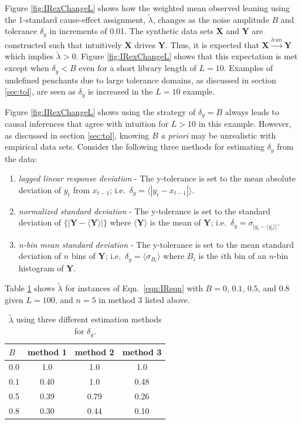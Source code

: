\documentclass[a4paper,11pt,twocolumn]{article}
\begin{document}
Figure \ref{fig:IRexChangeL} shows how the weighted mean observed leaning using the 1-standard cause-effect assignment, $\tilde{\lambda}$, changes as the noise amplitude $B$ and tolerance $\delta_y$ in increments of 0.01.  The synthetic data sets $\mathbf{X}$ and $\mathbf{Y}$ are constructed such that intuitively $\mathbf{X}$ drives $\mathbf{Y}$.  Thus, it is expected that $\mathbf{X}\xrightarrow{lean}\mathbf{Y}$ which implies $\tilde{\lambda} > 0$.  Figure \ref{fig:IRexChangeL} shows that this expectation is met except when $\delta_y < B$ even for a short library length of $L=10$.  Examples of undefined penchants due to large tolerance domains, as discussed in section \ref{sec:tol}, are seen as $\delta_y$ is increased in the $L=10$ example.

Figure \ref{fig:IRexChangeL} shows using the strategy of $\delta_y = B$ always leads to causal inferences that agree with intuition for $L>10$ in this example.  However, as discussed in section \ref{sec:tol}, knowing $B$ {\em a priori} may be unrealistic with empirical data sets.  Consider the following three methods for estimating $\delta_y$ from the data:
\begin{enumerate}
\item {\em lagged linear response deviation} - The y-tolerance is set to the mean absolute deviation of $y_t$ from $x_{t-1}$; i.e.\ $\delta_y = \langle|y_t-x_{t-1}|\rangle$.
\item {\em normalized standard deviation} - The y-tolerance is set to the standard deviation of $\{|\mathbf{Y}-\langle\mathbf{Y}\rangle|\}$ where $\langle\mathbf{Y}\rangle$ is the mean of $\mathbf{Y}$; i.e.\ $\delta_y = \sigma_{|y_t-\langle y_t\rangle|}$.
\item {\em n-bin mean standard deviation} - The y-tolerance is set to the mean standard deviation of $n$ bins of $\mathbf{Y}$; i.e.\ $\delta_y = \langle \sigma_{B_i}\rangle$ where $B_i$ is the $i$th bin of an $n$-bin histogram of $\mathbf{Y}$.    
\end{enumerate}  
Table \ref{tab:IRlagTolComp} shows $\tilde{\lambda}$ for instances of Eqn.\ \ref{eqn:IReqn} with $B = 0$, $0.1$, $0.5$, and $0.8$ given $L=100$, and $n=5$ in method 3 listed above.
\begin{table}
\begin{tabular}{lccc}
$B$ & method 1 & method 2 & method 3\\
\hline
0.0 & 1.0 & 1.0 & 1.0\\
0.1 & 0.40 & 1.0 & 0.48\\
0.5 & 0.39 & 0.79 & 0.26\\
0.8 & 0.30 & 0.44 & 0.10\\
\end{tabular}
\caption{$\tilde{\lambda}$ using three different estimation methods for $\delta_y$.}
\label{tab:IRlagTolComp}
\end{table}
\end{document}
